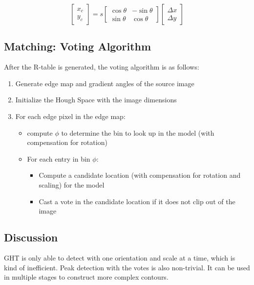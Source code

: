 \documentclass{article}
\begin{document}
\begin{multicols}{2}
$$
\left[\begin{matrix}x_c \\ y_c \end{matrix}\right] = s \left[\begin{matrix}\cos\theta & -\sin\theta \\ \sin\theta & \cos\theta \end{matrix}\right] \left[\begin{matrix} \Delta x \\ \Delta y\end{matrix}\right]
$$

\subsection{Matching: Voting Algorithm}

After the R-table is generated, the voting algorithm is as follows:

\begin{enumerate}
  \item Generate edge map and gradient angles of the source image
  \item Initialize the Hough Space with the image dimensions
  \item For each edge pixel in the edge map:
  \begin{itemize}
          \item compute $\phi$ to determine the bin to look up in the model (with compensation for rotation)
          \item For each entry in bin $\phi$:
          \begin{itemize}
                  \item Compute a candidate location (with compensation for rotation and scaling) for the model
                  \item Cast a vote in the candidate location if it does not clip out of the image
          \end{itemize}
  \end{itemize}
\end{enumerate}

\subsection{Discussion}

GHT is only able to detect with one orientation and scale at a time, which is kind of inefficient. Peak detection with the votes is also non-trivial. It can be used in multiple stages to construct more complex contours.


\end{multicols}
\end{document}
